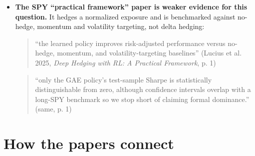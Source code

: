 \documentclass{article}
\begin{document}
\begin{itemize}
\item \textbf{The SPY ``practical framework'' paper is weaker evidence for this question.} It hedges a normalized exposure and is benchmarked against no-hedge, momentum and volatility targeting, not delta hedging:

\begin{quote}``the learned policy improves risk-adjusted performance versus no-hedge, momentum, and volatility-targeting baselines'' (Lucius et al. 2025, \emph{Deep Hedging with RL: A Practical Framework}, p. 1)\end{quote}

\begin{quote}``only the GAE policy's test-sample Sharpe is statistically distinguishable from zero, although confidence intervals overlap with a long-SPY benchmark so we stop short of claiming formal dominance.'' (same, p. 1)\end{quote}

\end{itemize}

\section{How the papers connect}
\end{document}

